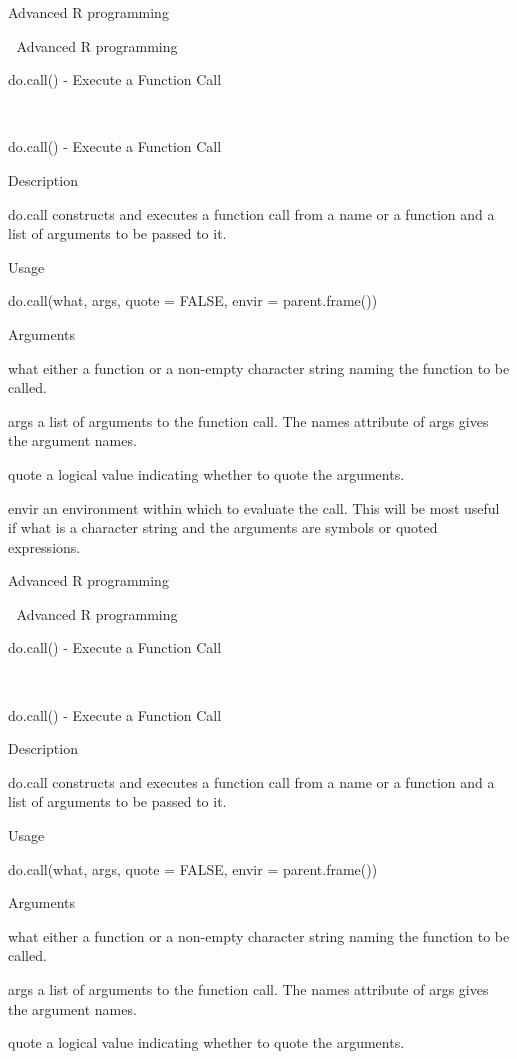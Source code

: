 


Advanced R programming


Advanced R programming

do.call()  - Execute a Function Call




do.call()  - Execute a Function Call


Description


do.call constructs and executes a function call from a name or a function and a list of arguments to be passed to it.


Usage


do.call(what, args, quote = FALSE, envir = parent.frame())


Arguments


what    either a function or a non-empty character string naming the function to be called.

args    a list of arguments to the function call. The names attribute of args gives the argument names.

quote    a logical value indicating whether to quote the arguments.

envir    an environment within which to evaluate the call. This will be most useful if what is a character string and the arguments are symbols or quoted expressions.





Advanced R programming


Advanced R programming

do.call()  - Execute a Function Call




do.call()  - Execute a Function Call


Description


do.call constructs and executes a function call from a name or a function and a list of arguments to be passed to it.


Usage


do.call(what, args, quote = FALSE, envir = parent.frame())


Arguments


what    either a function or a non-empty character string naming the function to be called.

args    a list of arguments to the function call. The names attribute of args gives the argument names.

quote    a logical value indicating whether to quote the arguments.

